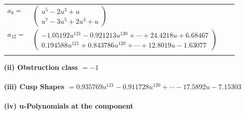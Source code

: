 \documentclass[1p]{elsarticle_modified}
\theoremstyle{definition}
\begin{document}
\begin{tabular}{m{7pt} m{180pt} m{7pt} m{180pt} }
\flushright $a_{8}=$&$\begin{pmatrix}u^5-2 u^3+u\\u^7-3 u^5+2 u^3+u\end{pmatrix}$ \\
\flushright $a_{12}=$&$\begin{pmatrix}-1.05192 u^{121}-0.921213 u^{120}+\cdots+24.4218 u+6.68467\\0.194588 u^{121}+0.843786 u^{120}+\cdots+12.8019 u-1.63077\end{pmatrix}$\\&\end{tabular}
\flushleft \textbf{(ii) Obstruction class $= -1$}\\~\\
\flushleft \textbf{(iii) Cusp Shapes $= 0.935769 u^{121}-0.911728 u^{120}+\cdots-17.5892 u-7.15303$}\\~\\
\newpage\renewcommand{\arraystretch}{1}
\flushleft \textbf{(iv) u-Polynomials at the component}\newline \\
\end{document}
